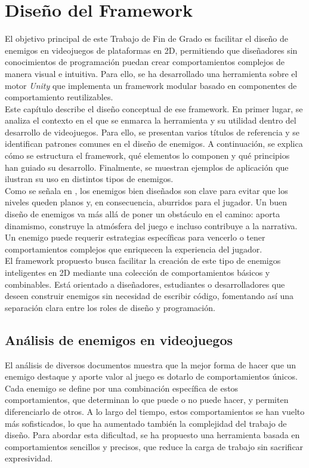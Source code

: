 
\chapter{Diseño del Framework}
\label{cap:descripcionTrabajo}

El objetivo principal de este Trabajo de Fin de Grado es facilitar el diseño de enemigos en videojuegos de plataformas en 2D, permitiendo que diseñadores sin conocimientos de programación puedan crear comportamientos complejos de manera visual e intuitiva. Para ello, se ha desarrollado una herramienta sobre el motor \textit{Unity} que implementa un framework modular basado en componentes de comportamiento reutilizables.\\

Este capítulo describe el diseño conceptual de ese framework. En primer lugar, se analiza el contexto en el que se enmarca la herramienta y su utilidad dentro del desarrollo de videojuegos. Para ello, se presentan varios títulos de referencia y se identifican patrones comunes en el diseño de enemigos. A continuación, se explica cómo se estructura el framework, qué elementos lo componen y qué principios han guiado su desarrollo. Finalmente, se muestran ejemplos de aplicación que ilustran su uso en distintos tipos de enemigos.\\

Como se señala en \citet{Build_a_Bad_Guy_Workshop}, los enemigos bien diseñados son clave para evitar que los niveles queden planos y, en consecuencia, aburridos para el jugador. Un buen diseño de enemigos va más allá de poner un obstáculo en el camino: aporta dinamismo, construye la atmósfera del juego e incluso contribuye a la narrativa. Un enemigo puede requerir estrategias específicas para vencerlo o tener comportamientos complejos que enriquecen la experiencia del jugador.\\

El framework propuesto busca facilitar la creación de este tipo de enemigos inteligentes en 2D mediante una colección de comportamientos básicos y combinables. Está orientado a diseñadores, estudiantes o desarrolladores que deseen construir enemigos sin necesidad de escribir código, fomentando así una separación clara entre los roles de diseño y programación.\\


\section{Análisis de enemigos en videojuegos}
El análisis de diversos documentos muestra que la mejor forma de hacer que un enemigo destaque y aporte valor al juego es dotarlo de comportamientos únicos. Cada enemigo se define por una combinación específica de estos comportamientos, que determinan lo que puede o no puede hacer, y permiten diferenciarlo de otros. A lo largo del tiempo, estos comportamientos se han vuelto más sofisticados, lo que ha aumentado también la complejidad del trabajo de diseño. Para abordar esta dificultad, se ha propuesto una herramienta basada en comportamientos sencillos y precisos, que reduce la carga de trabajo sin sacrificar expresividad.\\

